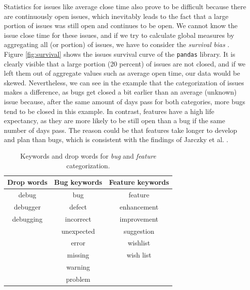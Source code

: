 Statistics for issues like average close time also prove to be difficult because there are continuously open issues, which inevitably leads to the fact that a large portion of issues was still open and continues to be open. We cannot know the issue close time for these issues, and if we try to calculate global measures by aggregating all (or portion) of issues, we have to consider the \textit{survival bias} \cite{jarczykSurgicalTeamsGitHub2018}. Figure \ref{fig:survival} shows the issues survival curve of the \texttt{pandas} library. It is clearly visible that a large portion (20 percent) of issues are not closed, and if we left them out of aggregate values such as average open time, our data would be skewed. Nevertheless, we can see in the example that the categorization of issues makes a difference, as bugs get closed a bit earlier than an average (unknown) issue because, after the same amount of days pass for both categories, more bugs tend to be closed in this example. In contrast, features have a high life expectancy, as they are more likely to be still open than a bug if the same number of days pass. The reason could be that features take longer to develop and plan than bugs, which is consistent with the findings of Jarczky et al. \cite{jarczykSurgicalTeamsGitHub2018}.

\begin{table}
    \centering
        \begin{tabular}{| c | c | c |}
            \hline
            \textbf{Drop words} & \textbf{Bug keywords} & \textbf{Feature keywords} \\
            \hline \hline
            debug & bug & feature \\
            debugger & defect & enhancement \\
            debugging & incorrect & improvement \\
             & unexpected & suggestion \\
             & error & wishlist \\
             & missing & wish list \\
             & warning & \\
             & problem & \\
            \hline
        \end{tabular}
    \caption{Keywords and drop words for \textit{bug} and \textit{feature} categorization.}
    \label{tab:keywords}
\end{table}



